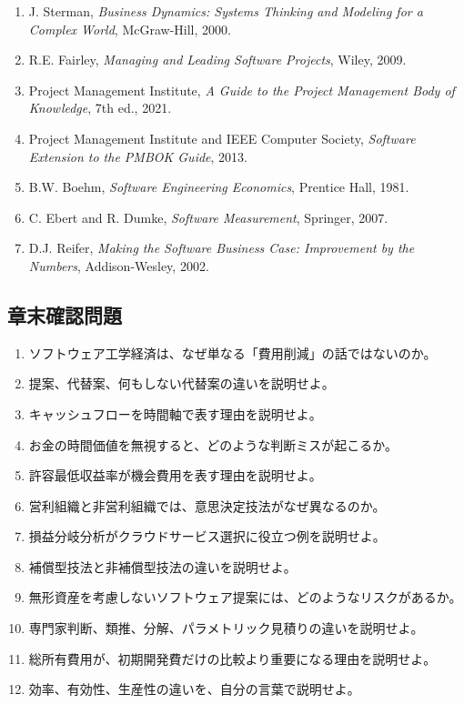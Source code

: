 \documentclass[a4paper,11pt]{ltjsarticle}
\numberwithin{figure}{section}
\numberwithin{table}{section}
\begin{document}
\begin{enumerate}
  \item J. Sterman, \textit{Business Dynamics: Systems Thinking and Modeling for a Complex World}, McGraw-Hill, 2000.
  \item R.E. Fairley, \textit{Managing and Leading Software Projects}, Wiley, 2009.
  \item Project Management Institute, \textit{A Guide to the Project Management Body of Knowledge}, 7th ed., 2021.
  \item Project Management Institute and IEEE Computer Society, \textit{Software Extension to the PMBOK Guide}, 2013.
  \item B.W. Boehm, \textit{Software Engineering Economics}, Prentice Hall, 1981.
  \item C. Ebert and R. Dumke, \textit{Software Measurement}, Springer, 2007.
  \item D.J. Reifer, \textit{Making the Software Business Case: Improvement by the Numbers}, Addison-Wesley, 2002.
\end{enumerate}

\subsection{章末確認問題}

\begin{enumerate}
  \item ソフトウェア工学経済は、なぜ単なる「費用削減」の話ではないのか。
  \item 提案、代替案、何もしない代替案の違いを説明せよ。
  \item キャッシュフローを時間軸で表す理由を説明せよ。
  \item お金の時間価値を無視すると、どのような判断ミスが起こるか。
  \item 許容最低収益率が機会費用を表す理由を説明せよ。
  \item 営利組織と非営利組織では、意思決定技法がなぜ異なるのか。
  \item 損益分岐分析がクラウドサービス選択に役立つ例を説明せよ。
  \item 補償型技法と非補償型技法の違いを説明せよ。
  \item 無形資産を考慮しないソフトウェア提案には、どのようなリスクがあるか。
  \item 専門家判断、類推、分解、パラメトリック見積りの違いを説明せよ。
  \item 総所有費用が、初期開発費だけの比較より重要になる理由を説明せよ。
  \item 効率、有効性、生産性の違いを、自分の言葉で説明せよ。
\end{enumerate}
\end{document}
